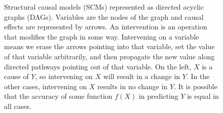 \documentclass{article}
\begin{document}
\begin{figure}[h]
    \centering
    
    \caption{Structural causal models (SCMs) represented as directed acyclic graphs (DAGs). Variables are the nodes of the graph and causal effects are represented by arrows. An intervention is an operation that modifies the graph in some way. Intervening on a variable means we erase the arrows pointing into that variable, set the value of that variable arbitrarily, and then propagate the new value along directed pathways pointing out of that variable. On the left, $X$ is a cause of $Y$, so intervening on $X$ will result in a change in $Y$. In the other cases, intervening on $X$ results in no change in $Y$. It is possible that the accuracy of some function $f(X)$ in predicting $Y$ is equal in all cases.}
\end{figure}
\end{document}
